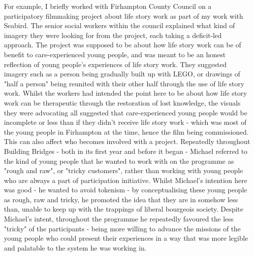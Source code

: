 For example, I briefly worked with Firhampton County Council on a participatory filmmaking project about life story work as part of my work with Seabird. The senior social workers within the council explained what kind of imagery they were looking for from the project, each taking a deficit-led approach. The project was supposed to be about how life story work can be of benefit to care-experienced young people, and was meant to be an honest reflection of young people's experiences of life story work. They suggested imagery  such as a person being gradually built up with LEGO, or drawings of "half a person" being reunited with their other half through the use of life story work. Whilst the workers had intended the point here to be about how life story work can be therapeutic through the restoration of lost knowledge, the visuals they were advocating all suggested that care-experienced young people would be incomplete or less than if they didn't receive life story work - which was most of the young people in Firhampton at the time, hence the film being commissioned. This can also affect who becomes involved with a project. Repeatedly throughout Building Bridges - both in its first year and before it began - Michael referred to the kind of young people that he wanted to work with on the programme as "rough and raw", or "tricky customers", rather than working with young people who are always a part of participation initiative. Whilst Michael's intention here was good - he wanted to avoid tokenism - by conceptualising these young people as rough, raw and tricky, he promoted the idea that they are in somehow less than, unable to keep up with the trappings of liberal bourgeois society. Despite Michael's intent, throughout the programme he repeatedly favoured the less "tricky" of the participants - being more willing to advance the missions of the young people who could present their experiences in a way that was more legible and palatable to the system he was working in.  

